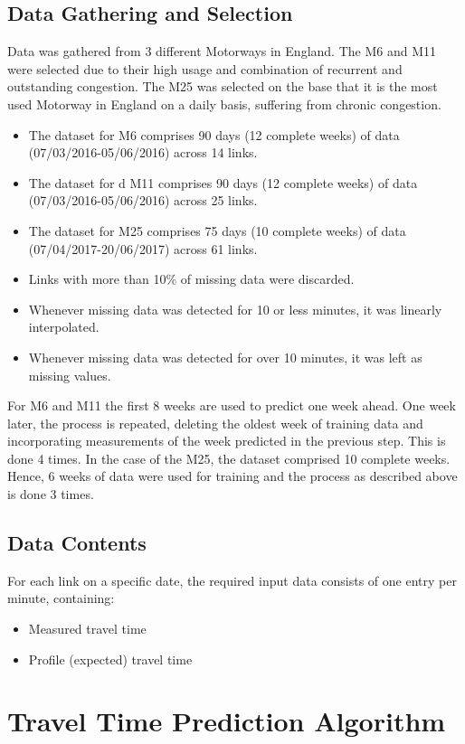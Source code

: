 \documentclass[conference, letterpaper]{IEEEtran}
\begin{document}
\subsection{Data Gathering and Selection}
Data was gathered from 3 different Motorways in England.
The M6 and M11 were selected due to their high usage and combination of recurrent and outstanding congestion. 
The M25 was selected on the base that it is the most used Motorway in England on a daily basis, suffering from chronic congestion.
\begin{itemize}
	\item The dataset for M6 comprises 90 days (12 complete weeks) of data (07/03/2016-05/06/2016) across 14 links.
	\item The dataset for d M11 comprises 90 days (12 complete weeks) of data (07/03/2016-05/06/2016) across 25 links.
	\item The dataset for M25 comprises 75 days (10 complete weeks) of data (07/04/2017-20/06/2017) across 61 links.
	\item Links with more than 10\% of missing data were discarded.
	\item Whenever missing data was detected for 10 or less minutes, it was linearly interpolated.
	\item Whenever missing data was detected for over 10 minutes, it was left as missing values.
\end{itemize}
For M6 and M11 the first 8 weeks are used to predict one week ahead.
One week later, the process is repeated, deleting the oldest week of training data and incorporating measurements of the week predicted in the previous step. This is done 4 times.
In the case of the M25, the dataset comprised 10 complete weeks. 
Hence, 6 weeks of data were used for training and the process as described above is done 3 times.
\subsection{Data Contents}
For each link on a specific date, the required input data consists of one entry per minute, containing:
\begin{itemize}
	\item Measured travel time
	\item Profile (expected) travel time 	
\end{itemize}


\section{Travel Time Prediction Algorithm} \label{algorithm}
\end{document}
